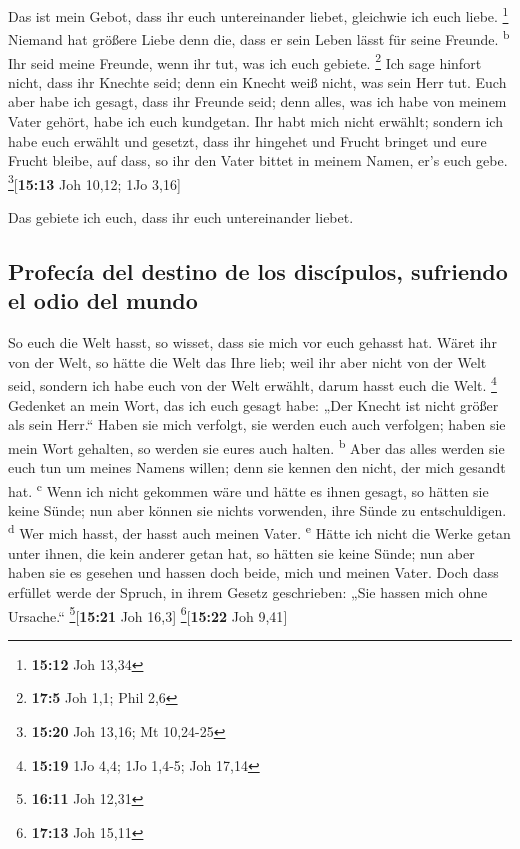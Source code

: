  Das ist mein Gebot, dass ihr euch untereinander liebet,
gleichwie ich euch liebe. \footnote{\textbf{15:12} Joh 13,34}
 Niemand hat größere Liebe denn die, dass er sein Leben
lässt für seine Freunde. \textsuperscript{b}  Ihr seid
meine Freunde, wenn ihr tut, was ich euch gebiete. \footnote{\textbf{17:5}
  Joh 1,1; Phil 2,6}  Ich sage hinfort nicht, dass ihr
Knechte seid; denn ein Knecht weiß nicht, was sein Herr tut. Euch aber
habe ich gesagt, dass ihr Freunde seid; denn alles, was ich habe von
meinem Vater gehört, habe ich euch kundgetan.  Ihr habt
mich nicht erwählt; sondern ich habe euch erwählt und gesetzt, dass ihr
hingehet und Frucht bringet und eure Frucht bleibe, auf dass, so ihr den
Vater bittet in meinem Namen, er's euch gebe.
\footnote{\textbf{15:20} Joh 13,16; Mt 10,24-25}{[}\textbf{15:13} Joh
10,12; 1Jo 3,16{]}

 Das gebiete ich euch, dass ihr euch untereinander
liebet.

\hypertarget{profecuxeda-del-destino-de-los-discuxedpulos-sufriendo-el-odio-del-mundo}{%
\subsection{Profecía del destino de los discípulos, sufriendo el odio
del
mundo}\label{profecuxeda-del-destino-de-los-discuxedpulos-sufriendo-el-odio-del-mundo}}

 So euch die Welt hasst, so wisset, dass sie mich vor
euch gehasst hat.  Wäret ihr von der Welt, so hätte die
Welt das Ihre lieb; weil ihr aber nicht von der Welt seid, sondern ich
habe euch von der Welt erwählt, darum hasst euch die Welt. \footnote{\textbf{15:19}
  1Jo 4,4; 1Jo 1,4-5; Joh 17,14}  Gedenket an mein Wort,
das ich euch gesagt habe: „Der Knecht ist nicht größer als sein Herr.``
Haben sie mich verfolgt, sie werden euch auch verfolgen; haben sie mein
Wort gehalten, so werden sie eures auch halten. \textsuperscript{b}
 Aber das alles werden sie euch tun um meines Namens
willen; denn sie kennen den nicht, der mich gesandt hat.
\textsuperscript{c}  Wenn ich nicht gekommen wäre und
hätte es ihnen gesagt, so hätten sie keine Sünde; nun aber können sie
nichts vorwenden, ihre Sünde zu entschuldigen. \textsuperscript{d}
 Wer mich hasst, der hasst auch meinen Vater.
\textsuperscript{e}  Hätte ich nicht die Werke getan
unter ihnen, die kein anderer getan hat, so hätten sie keine Sünde; nun
aber haben sie es gesehen und hassen doch beide, mich und meinen Vater.
 Doch dass erfüllet werde der Spruch, in ihrem Gesetz
geschrieben: „Sie hassen mich ohne Ursache.``
\footnote{\textbf{16:11} Joh 12,31}{[}\textbf{15:21} Joh 16,3{]}
\footnote{\textbf{17:13} Joh 15,11}{[}\textbf{15:22} Joh 9,41{]}

